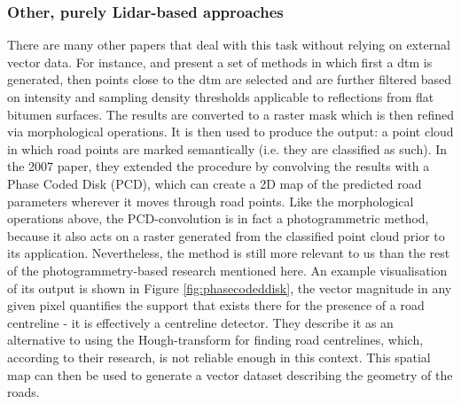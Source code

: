 \subsubsection{Other, purely Lidar-based approaches}

There are many other papers that deal with this task without relying on external vector data. For instance, \cite{clode_etal_2004} and \cite{clode_etal_2007} present a set of methods in which first a \ac{dtm} is generated, then points close to the \ac{dtm} are selected and are further filtered based on intensity and sampling density thresholds applicable to reflections from flat bitumen surfaces. The results are converted to a raster mask which is then refined via morphological operations. It is then used to produce the output: a point cloud in which road points are marked semantically (i.e. they are classified as such). In the 2007 paper, they extended the procedure by convolving the results with a Phase Coded Disk (PCD), which can create a 2D map of the predicted road parameters wherever it moves through road points. Like the morphological operations above, the PCD-convolution is in fact a photogrammetric method, because it also acts on a raster generated from the classified point cloud prior to its application. Nevertheless, the method is still more relevant to us than the rest of the photogrammetry-based research mentioned here. An example visualisation of its output is shown in Figure \ref{fig:phasecodeddisk}, the vector magnitude in any given pixel quantifies the support that exists there for the presence of a road centreline - it is effectively a centreline detector. They describe it as an alternative to using the Hough-transform for finding road centrelines, which, according to their research, is not reliable enough in this context. This spatial map can then be used to generate a vector dataset describing the geometry of the roads.

